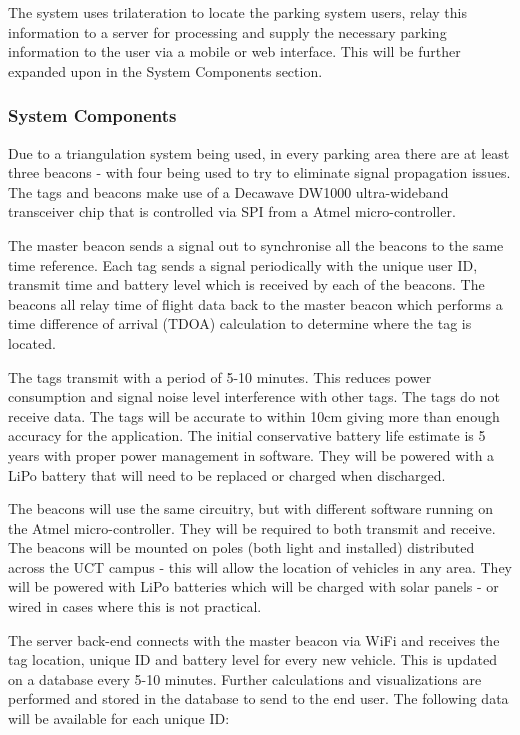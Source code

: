 The system uses trilateration to locate the parking system users, relay this information to a server for processing and supply the necessary parking information to the user via a mobile or web interface. This will be further expanded upon in the System Components section.

\newpage
\subsubsection{System Components}
Due to a triangulation system being used, in every parking area there are at least three beacons - with four being used to try to eliminate signal propagation issues. The tags and beacons make use of a Decawave DW1000 ultra-wideband transceiver chip that is controlled via SPI from a Atmel micro-controller. 

The master beacon sends a signal out to synchronise all the beacons to the same time reference. Each tag sends a signal periodically with the unique user ID, transmit time and battery level which is received by each of the beacons. The beacons all relay time of flight data back to the master beacon which performs a time difference of arrival (TDOA) calculation to determine where the tag is located.\cite{decawave-presentation}

The tags transmit with a period of 5-10 minutes. This reduces power consumption and signal noise level interference with other tags. The tags do not receive data. The tags will be accurate to within 10cm giving more than enough accuracy for the application. The initial conservative battery life estimate is 5 years with proper power management in software. They will be powered with a LiPo battery that will need to be replaced or charged when discharged.

The beacons will use the same circuitry, but with different software running on the Atmel micro-controller. They will be required to both transmit and receive. The beacons will be mounted on poles (both light and installed) distributed across the UCT campus - this will allow the location of vehicles in any area. They will be powered with LiPo batteries which will be charged with solar panels - or wired in cases where this is not practical.

The server back-end connects with the master beacon via WiFi and receives the tag location, unique ID and battery level for every new vehicle. This is updated on a database every 5-10 minutes. Further calculations and visualizations are performed and stored in the database to send to the end user. The following data will be available for each unique ID:

